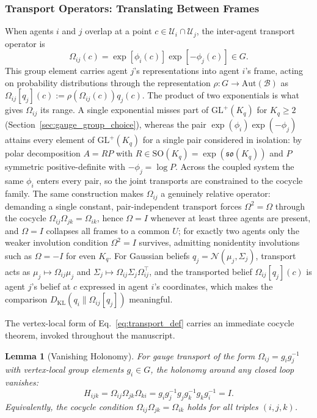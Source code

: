 \documentclass[11pt]{article}
\newtheorem{lemma}{Lemma}
\begin{document}
\subsubsection{Transport Operators: Translating Between Frames}
\label{sec:transport}

When agents $i$ and $j$ overlap at a point $c \in \mathcal{U}_i \cap \mathcal{U}_j$, the inter-agent transport operator is
\begin{equation}
\Omega_{ij}(c) = \exp[\phi_i(c)] \exp[-\phi_j(c)] \in G.
\label{eq:transport_def}
\end{equation}
This group element carries agent $j$'s representations into agent $i$'s frame, acting on probability distributions through the representation $\rho: G \to \mathrm{Aut}(\mathcal{B})$ as $\Omega_{ij}[q_j](c) := \rho(\Omega_{ij}(c)) q_j(c)$. The product of two exponentials is what gives $\Omega_{ij}$ its range. A single exponential misses part of $\mathrm{GL}^+(K_q)$ for $K_q \geq 2$ (Section~\ref{sec:gauge_group_choice}), whereas the pair $\exp(\phi_i)\exp(-\phi_j)$ attains every element of $\mathrm{GL}^+(K_q)$ for a single pair considered in isolation: by polar decomposition $A = RP$ with $R \in \mathrm{SO}(K_q) = \exp(\mathfrak{so}(K_q))$ and $P$ symmetric positive-definite with $-\phi_j = \log P$. Across the coupled system the same $\phi_i$ enters every pair, so the joint transports are constrained to the cocycle family. The same construction makes $\Omega_{ij}$ a genuinely relative operator: demanding a single constant, pair-independent transport forces $\Omega^2 = \Omega$ through the cocycle $\Omega_{ij}\Omega_{jk} = \Omega_{ik}$, hence $\Omega = I$ whenever at least three agents are present, and $\Omega = I$ collapses all frames to a common $U$; for exactly two agents only the weaker involution condition $\Omega^2 = I$ survives, admitting nonidentity involutions such as $\Omega = -I$ for even $K_q$. For Gaussian beliefs $q_j = \mathcal{N}(\mu_j, \Sigma_j)$, transport acts as $\mu_j \mapsto \Omega_{ij}\mu_j$ and $\Sigma_j \mapsto \Omega_{ij}\Sigma_j \Omega_{ij}^\top$, and the transported belief $\Omega_{ij}[q_j](c)$ is agent $j$'s belief at $c$ expressed in agent $i$'s coordinates, which makes the comparison $D_{\mathrm{KL}}(q_i \| \Omega_{ij}[q_j])$ meaningful.

The vertex-local form of Eq.~\eqref{eq:transport_def} carries an immediate cocycle theorem, invoked throughout the manuscript.

\begin{lemma}[Vanishing Holonomy]
\label{thm:vanishing_holonomy}
For gauge transport of the form $\Omega_{ij} = g_ig_j^{-1}$ with vertex-local group elements $g_i \in G$, the holonomy around any closed loop vanishes:
\begin{equation}
H_{ijk} = \Omega_{ij}\Omega_{jk}\Omega_{ki}
= g_ig_j^{-1}g_jg_k^{-1}g_kg_i^{-1}
= I.
\label{eq:holonomy}
\end{equation}
Equivalently, the cocycle condition $\Omega_{ij}\Omega_{jk} = \Omega_{ik}$ holds for all triples $(i,j,k)$.
\end{lemma}
\end{document}
